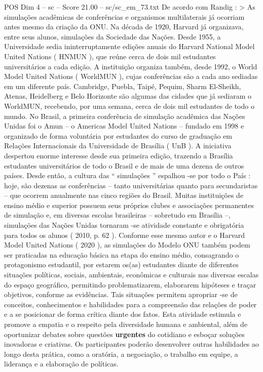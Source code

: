 \begin{textsample}{POS Dim 4 – sc – Score 21.00 – sc/sc\_em\_73.txt}
De acordo com Randig : > As simulações acadêmicas de conferências e organismos multilaterais já ocorriam antes mesmo da criação da ONU.
Na década de 1920, Harvard já organizava, entre seus alunos, simulações da Sociedade das Nações.
Desde 1955, a Universidade sedia ininterruptamente edições anuais do Harvard National Model United Nations ( HNMUN ), que reúne cerca de dois mil estudantes universitários a cada edição.
A instituição organiza também, desde 1992, o World Model United Nations ( WorldMUN ), cujas conferências são a cada ano sediadas em um diferente país.
Cambridge, Puebla, Taipé, Pequim, Sharm El-Sheikh, Atenas, Heidelberg e Belo Horizonte são algumas das cidades que já sediaram o WorldMUN, recebendo, por uma semana, cerca de dois mil estudantes de todo o mundo.
No Brasil, a primeira conferência de simulação acadêmica das Nações Unidas foi o Amun – o Americas Model United Nations – fundado em 1998 e organizado de forma voluntária por estudantes do curso de graduação em Relações Internacionais da Universidade de Brasília ( UnB ).
A iniciativa despertou enorme interesse desde sua primeira edição, trazendo a Brasília estudantes universitários de todo o Brasil e de mais de uma dezena de outros países.
Desde então, a cultura das “ simulações ” espalhou -se por todo o País : hoje, são dezenas as conferências – tanto universitárias quanto para secundaristas – que ocorrem anualmente nas cinco regiões do Brasil.
Muitas instituições de ensino médio e superior possuem seus próprios clubes e associações permanentes de simulação e, em diversas escolas brasileiras – sobretudo em Brasília –, simulações das Nações Unidas tornaram -se atividade constante e obrigatória para todos os alunos ( 2010, p. 62 ).
Conforme esse mesmo autor e o Harvard Model United Nations ( 2020 ), as simulações do Modelo ONU também podem ser praticadas na educação básica na etapa do ensino médio, consagrando o protagonismo estudantil, por estarem os(as) estudantes diante de diferentes situações políticas, sociais, ambientais, econômicas e culturais nas diversas escalas do espaço geográfico, permitindo problematizarem, elaborarem hipóteses e traçar objetivos, conforme as evidências.
Tais situações permitem apropriar -se de conceitos, conhecimentos e habilidades para a compreensão das relações de poder e a se posicionar de forma crítica diante dos fatos.
Esta atividade estimula e promove a empatia e o respeito pela diversidade humana e ambiental, além de oportunizar debates sobre questões \textbf{urgentes} do cotidiano e esboçar soluções inovadoras e criativas.
Os participantes poderão desenvolver outras habilidades ao longo desta prática, como a oratória, a negociação, o trabalho em equipe, a liderança e a elaboração de políticas.

\end{textsample}
